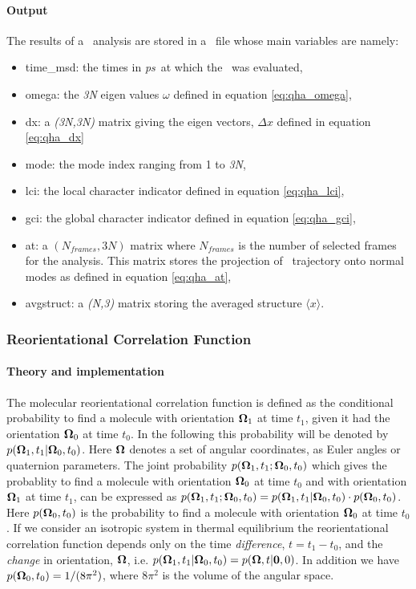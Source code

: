 \documentclass[a4paper,11pt]{report}
\newcommand{\ps}{\textit{ps}}
\begin{document}
\paragraph{Output\\}
The results of a \QHA\ analysis are stored in a \NetCDF\ file whose main variables are namely:
\begin{itemize}
\item time\_msd: the times in \ps\ at which the \QHA\ was evaluated,
\item omega: the \textit{3N} eigen values $\omega$ defined in equation \ref{eq:qha_omega},
\item dx: a \textit{(3N,3N)} matrix giving the eigen vectors, $\Delta x$ defined in equation \ref{eq:qha_dx}
\item mode: the mode index ranging from 1 to \textit{3N},
\item lci: the local character indicator defined in equation \ref{eq:qha_lci},
\item gci: the global character indicator defined in equation \ref{eq:qha_gci},
\item at: a $(N_{frames},3N)$ matrix where $N_{frames}$ is the number of selected frames for the analysis. This matrix stores 
the projection of \MD\ trajectory onto normal modes as defined in equation \ref{eq:qha_at},
\item{avgstruct: a \textit{(N,3)} matrix storing the averaged structure $\langle x\rangle$}.
\end{itemize}

\subsubsection{Reorientational Correlation Function}
\label{rcf}
\paragraph{Theory and implementation\\}
\label{rcf_theory}
The molecular reorientational correlation function is defined as the conditional probability to find a molecule with 
orientation ${\bf\Omega}_1$ at time $t_1$, given it had the orientation ${\bf\Omega}_0$ at time $t_0$.  In the following 
this probability will be denoted by $p({\bf\Omega}_1,t_1|{\bf\Omega}_0,t_0)$.  Here ${\bf\Omega}$ denotes a set of angular 
coordinates, as Euler angles or quaternion parameters. The joint probability $p({\bf\Omega}_1,t_1;{\bf\Omega}_0,t_0)$ which 
gives the probablity to find a molecule with orientation ${\bf\Omega}_0$ at time $t_0$ and with orientation ${\bf\Omega}_1$ 
at time $t_1$, can be expressed as 
$p({\bf\Omega}_1,t_1;{\bf\Omega}_0,t_0) = p({\bf\Omega}_1,t_1|{\bf\Omega}_0,t_0)\cdot p({\bf\Omega}_0,t_0)$.
Here $p({\bf\Omega}_0,t_0)$ is the probability to find a molecule with orientation ${\bf\Omega}_0$ at time $t_0$. If we 
consider an isotropic system in thermal equilibrium the reorientational correlation function depends only on the time 
{\em difference}, $t = t_1-t_0$, and the {\em change} in orientation, ${\bf\Omega}$, i.e. 
$p({\bf\Omega}_1,t_1|{\bf\Omega}_0,t_0) = p({\bf\Omega},t|{\bf 0},0)$. In addition we have 
$p({\bf\Omega}_0,t_0) = 1/(8\pi^2)$, where $8\pi^2$ is the volume of the angular space.
\end{document}
